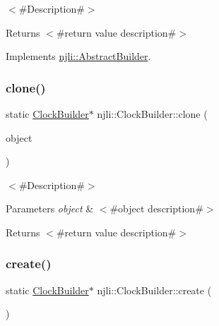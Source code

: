 $<$\#\+Description\#$>$

\begin{DoxyReturn}{Returns}
$<$\#return value description\#$>$ 
\end{DoxyReturn}


Implements \mbox{\hyperlink{classnjli_1_1_abstract_builder_aa1d220053e182c37b31b427499c6eacf}{njli\+::\+Abstract\+Builder}}.

\mbox{\label{classnjli_1_1_clock_builder_a7c84e707ce704ab2d0c30bdba37d00c8}} 
\subsubsection{\texorpdfstring{clone()}{clone()}}
{\footnotesize\ttfamily static \mbox{\hyperlink{classnjli_1_1_clock_builder}{Clock\+Builder}}$\ast$ njli\+::\+Clock\+Builder\+::clone (\begin{DoxyParamCaption}\item[{const \mbox{\hyperlink{classnjli_1_1_clock_builder}{Clock\+Builder}} \&}]{object }\end{DoxyParamCaption})\hspace{0.3cm}{\ttfamily [static]}}

$<$\#\+Description\#$>$


\begin{DoxyParams}{Parameters}
{\em object} & $<$\#object description\#$>$\\
\hline
\end{DoxyParams}
\begin{DoxyReturn}{Returns}
$<$\#return value description\#$>$ 
\end{DoxyReturn}
\mbox{\label{classnjli_1_1_clock_builder_aab639feccc6592061e99bd343a93a92e}} 
\subsubsection{\texorpdfstring{create()}{create()}}
{\footnotesize\ttfamily static \mbox{\hyperlink{classnjli_1_1_clock_builder}{Clock\+Builder}}$\ast$ njli\+::\+Clock\+Builder\+::create (\begin{DoxyParamCaption}{ }\end{DoxyParamCaption})\hspace{0.3cm}{\ttfamily [static]}}

